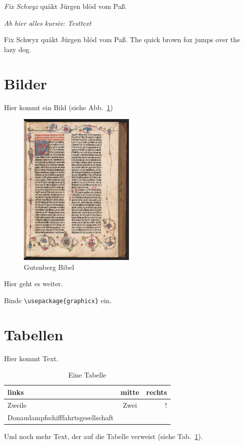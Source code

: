 \documentclass[a4paper]{article}
\begin{document}
\textit{Fix Schwyz} quäkt Jürgen blöd vom Paß.

\itshape
Ab hier alles kursiv: Testtext

Fix Schwyz quäkt Jürgen blöd vom Paß.
The quick brown fox jumps over the lazy dog.
\upshape

\section{Bilder}

Hier kommt ein Bild (siehe Abb.~\ref{im:Bibel})

\begin{figure}
\begin{center}
    \includegraphics[width=0.5\textwidth]{./res/gutenberg.jpg}
\caption{Gutenberg Bibel}
\label{im:Bibel}
\end{center}
\end{figure}

Hier geht es weiter.
\listoffigures

Binde \verb+\usepackage{graphicx}+ ein.

\section{Tabellen}
Hier kommt Text.
\begin{table}[tbp]
\begin{center}
\begin{tabular}{|p{2cm}|c r|}
\hline
links    &    mitte    &    rechts\\
\hline
Zweile   &    Zwei     &    !\\
Donau\-dampf\-schiff\-fahrts\-ge\-sell\-schaft&&\\
\hline
\hline
\end{tabular}
\caption{Eine Tabelle}
\label{tab:Tabelle}
\end{center}
\end{table}
Und noch mehr Text, der auf die Tabelle verweist (siehe Tab.~\ref{tab:Tabelle}).
\listoftables
\end{document}
